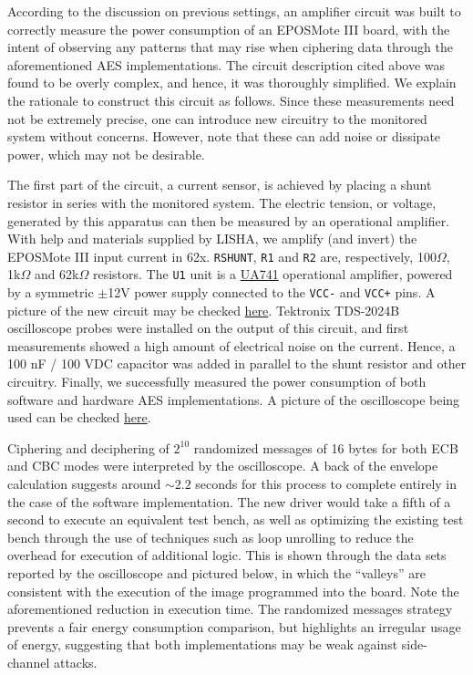 \documentclass{../sftex/sftex}
\begin{document}
According to the discussion on previous settings, an amplifier circuit was
built to correctly measure the power consumption of an EPOSMote III board, with
the intent of observing any patterns that may rise when ciphering data through
the aforementioned AES implementations. The circuit description cited above was
found to be overly complex, and hence, it was thoroughly simplified. We explain
the rationale to construct this circuit as follows. Since these measurements
need not be extremely precise, one can introduce new circuitry to the monitored
system without concerns. However, note that these can add noise or dissipate
power, which may not be desirable.

The first part of the circuit, a current sensor, is achieved by placing a shunt
resistor in series with the monitored system. The electric tension, or voltage,
generated by this apparatus can then be measured by an operational amplifier.
With help and materials supplied by LISHA, we amplify (and invert) the EPOSMote
III input current in 62x. \verb!RSHUNT!, \verb!R1! and \verb!R2! are,
respectively, 100$\Omega$, 1k$\Omega$ and 62k$\Omega$ resistors. The \verb!U1!
unit is a \href{http://www.ti.com/product/UA741}{UA741} operational amplifier,
powered by a symmetric $\pm$12V power supply connected to the \verb!VCC-! and
\verb!VCC+! pins. A picture of the new circuit may be checked
\href{https://epos.lisha.ufsc.br/dl821?display}{here}. Tektronix TDS-2024B
oscilloscope probes were installed on the output of this circuit, and first
measurements showed a high amount of electrical noise on the current. Hence, a
100 nF / 100 VDC capacitor was added in parallel to the shunt resistor and
other circuitry. Finally, we successfully measured the power consumption of
both software and hardware AES implementations. A picture of the oscilloscope
being used can be checked
\href{https://epos.lisha.ufsc.br/dl824?display}{here}.

Ciphering and deciphering of $2^{10}$ randomized messages of 16 bytes for both
ECB and CBC modes were interpreted by the oscilloscope. A back of the envelope
calculation suggests around $\sim 2.2$ seconds for this process to complete
entirely in the case of the software implementation. The new driver would take
a fifth of a second to execute an equivalent test bench, as well as optimizing
the existing test bench through the use of techniques such as loop unrolling to
reduce the overhead for execution of additional logic. This is shown through
the data sets reported by the oscilloscope and pictured below, in which the
``valleys'' are consistent with the execution of the image programmed into the
board. Note the aforementioned reduction in execution time. The randomized
messages strategy prevents a fair energy consumption comparison, but highlights
an irregular usage of energy, suggesting that both implementations may be weak
against side-channel attacks.
\end{document}
